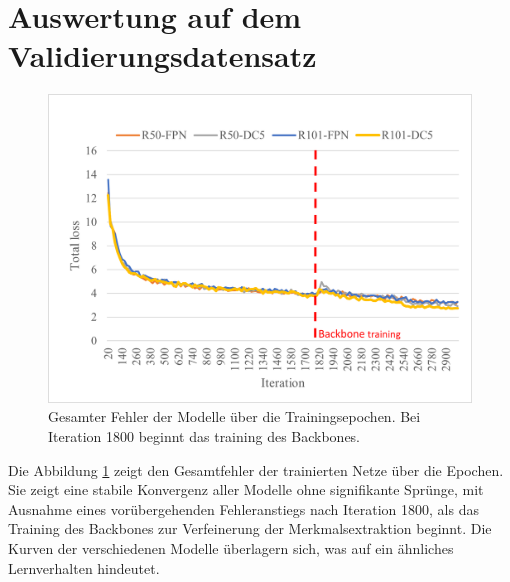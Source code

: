 \section{Auswertung auf dem Validierungsdatensatz}
\begin{figure}[h]
    \centering
    \includegraphics[]{img/eval/total_loss.png}
    \caption{Gesamter Fehler der Modelle über die Trainingsepochen. Bei Iteration 1800 beginnt das training des Backbones.}
    \label{fig:loss}
\end{figure}
Die Abbildung \ref{fig:loss} zeigt den Gesamtfehler der trainierten Netze über die Epochen. Sie zeigt eine stabile Konvergenz aller Modelle ohne signifikante Sprünge, mit Ausnahme eines vorübergehenden Fehleranstiegs nach Iteration 1800, als das Training des Backbones zur Verfeinerung der Merkmalsextraktion beginnt. Die Kurven der verschiedenen Modelle überlagern sich, was auf ein ähnliches Lernverhalten hindeutet.
\clearpage
